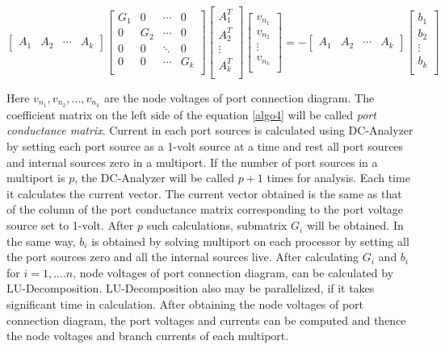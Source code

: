 \documentclass[12pt,psfig,a4]{article}
\begin{document}
\begin{equation}
\left[\begin{array}{llll}
A_{1} & A_{2} & {\cdots} & A_{k}
\end{array}\right]
\left[\begin{array}{llll}
G_{1} &  0 & {\cdots} & 0\\ 
0  & G_{2} & {\cdots} & 0\\ 
0 & 0 & {\ddots} & 0\\ 
0 & 0 & {\cdots} & G_{k}\\ 
\end{array}\right]
\left[\begin{array}{l}
A_{1}^{T}\\
A_{2}^{T}\\
{\vdots}\\
A_{k}^{T}\\
\end{array}\right]
\left[\begin{array}{l}
v_{n_{1}}\\
v_{n_{2}}\\
{\vdots}\\
v_{n_{k}}\\
\end{array}\right] = - 
\left[\begin{array}{llll}  
A_{1} & A_{2} & {\cdots} & A_{k}
\end{array}\right]
\left[\begin{array}{l}
b_{1}\\
b_{2}\\
{\vdots}\\
b_{k}\\
\end{array}\right]
\label{algo4}
\end{equation}

Here $v_{n_{1}}, v_{n_{2}}, ..., v_{n_{k}}$ are the node voltages of port connection diagram. The coefficient matrix on the left
side of the equation \ref{algo4} will be called {\it port conductance matrix}.
Current in each port sources is calculated using DC-Analyzer by setting each port 
source as a 1-volt source at a time and rest all port sources and internal sources zero in a multiport.
If the number of port sources in a multiport is $p$, the DC-Analyzer will be called $p+1$ times for
analysis. Each time it calculates the current vector. The current vector obtained is the same as that of the 
column of the port conductance matrix corresponding to  the port voltage source set to 1-volt. After $p$ such calculations, submatrix $G_{i}$
will be obtained. In the same way, $b_{i}$ is obtained by solving multiport on each processor by setting 
all the port sources zero and all the internal sources live. After calculating $G_{i}$ and $b_{i}$ 
for $i=1,....n$, node voltages of port connection diagram, can be calculated by LU-Decomposition. 
LU-Decomposition \cite{Golub,DON} also may be parallelized, if it takes significant time in calculation. 
After obtaining the node voltages of port connection diagram, the port voltages
and currents can be computed and thence the node voltages and branch currents of 
each multiport.
\end{document}
